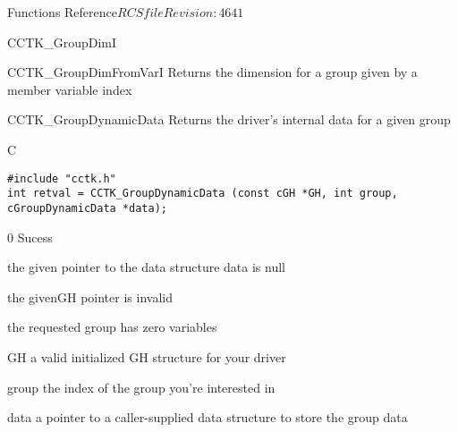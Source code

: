 \begin{cactuspart}{ Functions Reference}{$RCSfile$}{$Revision: 4641 $}
\begin{FunctionDescription}{CCTK\_GroupDimI}
\begin{SeeAlsoSection}
\begin{SeeAlso}{CCTK\_GroupDimFromVarI}
Returns the dimension for a group given by a member variable index
\end{SeeAlso}
\end{SeeAlsoSection}
\end{FunctionDescription}


\begin{FunctionDescription}{CCTK\_GroupDynamicData}{}
\label{CCTK-GroupDynamicData}
Returns the driver's internal data for a given group
\begin{SynopsisSection}
\begin{Synopsis}{C}
\begin{verbatim}
#include "cctk.h"
int retval = CCTK_GroupDynamicData (const cGH *GH, int group, cGroupDynamicData *data);
\end{verbatim}
\end{Synopsis}
\end{SynopsisSection}

\begin{ResultSection}
\begin {Result}{0}
Sucess
\end{Result}
\begin{Result}{-1}
the given pointer to the data structure data is null
\end{Result}
\begin{Result}{-3}
the givenGH pointer is invalid
\end{Result}
\begin{Result}{-77}
the requested group has zero variables
\end{Result}
\end{ResultSection}

\begin{ParameterSection}
\begin{Parameter}{GH}
a valid initialized GH structure for your driver
\end{Parameter}
\begin{Parameter}{group}
the index of the group you're interested in
\end{Parameter}
\begin{Parameter}{data}
a pointer to a caller-supplied data structure to store the group data
\end{Parameter}
\end{ParameterSection}


\end{FunctionDescription}
\end{cactuspart}
